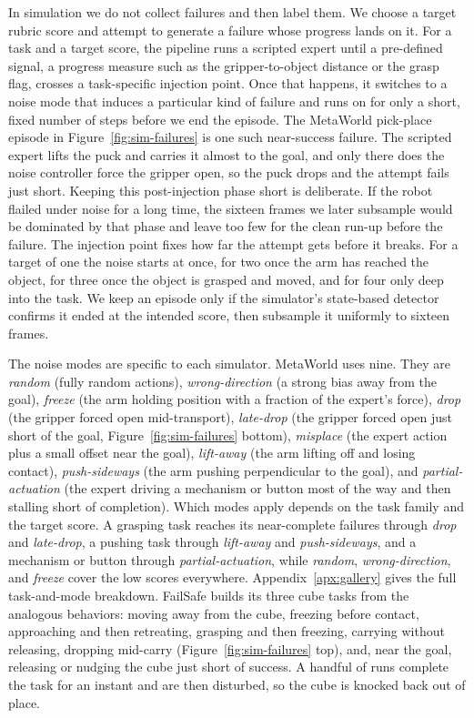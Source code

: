 \label{sec:method-sim-failures}

In simulation we do not collect failures and then label them. We choose a target rubric score and attempt to generate a failure whose progress lands on it. For a task and a target score, the pipeline runs a scripted expert until a pre-defined signal, a progress measure such as the gripper-to-object distance or the grasp flag, crosses a task-specific injection point. Once that happens, it switches to a noise mode that induces a particular kind of failure and runs on for only a short, fixed number of steps before we end the episode. The MetaWorld pick-place episode in Figure~\ref{fig:sim-failures} is one such near-success failure. The scripted expert lifts the puck and carries it almost to the goal, and only there does the noise controller force the gripper open, so the puck drops and the attempt fails just short. Keeping this post-injection phase short is deliberate. If the robot flailed under noise for a long time, the sixteen frames we later subsample would be dominated by that phase and leave too few for the clean run-up before the failure. The injection point fixes how far the attempt gets before it breaks. For a target of one the noise starts at once, for two once the arm has reached the object, for three once the object is grasped and moved, and for four only deep into the task. We keep an episode only if the simulator's state-based detector confirms it ended at the intended score, then subsample it uniformly to sixteen frames.

The noise modes are specific to each simulator. MetaWorld uses nine. They are \emph{random} (fully random actions), \emph{wrong-direction} (a strong bias away from the goal), \emph{freeze} (the arm holding position with a fraction of the expert's force), \emph{drop} (the gripper forced open mid-transport), \emph{late-drop} (the gripper forced open just short of the goal, Figure~\ref{fig:sim-failures} bottom), \emph{misplace} (the expert action plus a small offset near the goal), \emph{lift-away} (the arm lifting off and losing contact), \emph{push-sideways} (the arm pushing perpendicular to the goal), and \emph{partial-actuation} (the expert driving a mechanism or button most of the way and then stalling short of completion). Which modes apply depends on the task family and the target score. A grasping task reaches its near-complete failures through \emph{drop} and \emph{late-drop}, a pushing task through \emph{lift-away} and \emph{push-sideways}, and a mechanism or button through \emph{partial-actuation}, while \emph{random}, \emph{wrong-direction}, and \emph{freeze} cover the low scores everywhere. Appendix~\ref{apx:gallery} gives the full task-and-mode breakdown. FailSafe builds its three cube tasks from the analogous behaviors: moving away from the cube, freezing before contact, approaching and then retreating, grasping and then freezing, carrying without releasing, dropping mid-carry (Figure~\ref{fig:sim-failures} top), and, near the goal, releasing or nudging the cube just short of success. A handful of runs complete the task for an instant and are then disturbed, so the cube is knocked back out of place.

